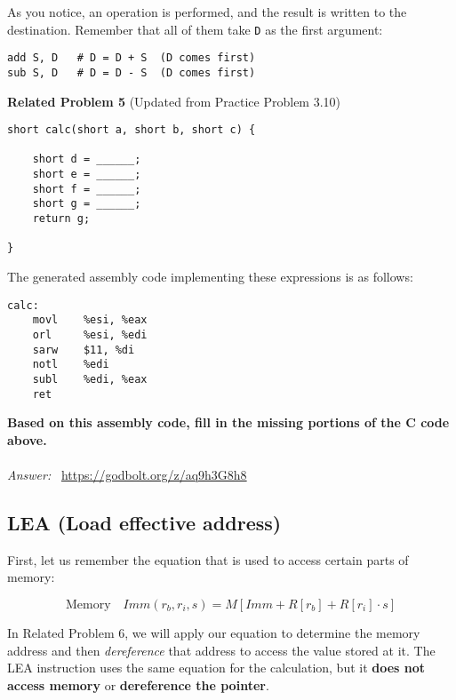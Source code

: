 As you notice, an operation is performed, and the result is written to the destination. 
Remember that all of them take \texttt{D} as the first argument:

\begin{verbatim}
add S, D   # D = D + S  (D comes first)
sub S, D   # D = D - S  (D comes first)
\end{verbatim}

\noindent
\textbf{Related Problem 5} (Updated from Practice Problem 3.10)

\begin{lstlisting}
short calc(short a, short b, short c) {

    short d = ______;
    short e = ______;
    short f = ______;
    short g = ______;
    return g;
    
}
\end{lstlisting}

The generated assembly code implementing these expressions is as follows:

\begin{lstlisting}
calc:
    movl    %esi, %eax
    orl     %esi, %edi
    sarw    $11, %di
    notl    %edi
    subl    %edi, %eax
    ret
\end{lstlisting}

\noindent
\textbf{Based on this assembly code, fill in the missing portions of the C code above.} \\
\\
\textit{Answer: }~\url{https://godbolt.org/z/aq9h3G8h8}
\subsection{LEA (Load effective address)}
First, let us remember the equation that is used to access certain parts of memory:
\noindent 
\\
\begin{tcolorbox}[colframe=black, colback=white, boxrule=1pt, title=Scaled Indexed Addressing Mode]
    \begin{equation*}
        \text{Memory} \quad \textit{Imm}(r_b, r_i, s) = M[\textit{Imm} + R[r_b] + R[r_i] \cdot s]
    \end{equation*}
    \label{equation_mem}
\end{tcolorbox}
%
\noindent
%
In Related Problem 6, we will apply our equation to determine the memory address and 
then \textit{dereference} that address to access the value stored at it.
%
The LEA instruction uses the same equation for the calculation, but it 
\textbf{does not access memory} or \textbf{dereference the pointer}.

